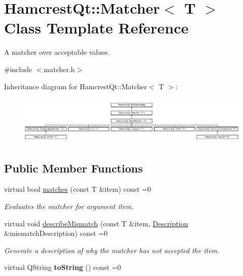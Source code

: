 \hypertarget{class_hamcrest_qt_1_1_matcher}{\section{Hamcrest\-Qt\-:\-:Matcher$<$ T $>$ Class Template Reference}
\label{class_hamcrest_qt_1_1_matcher}
}


A matcher over acceptable values.  




{\ttfamily \#include $<$matcher.\-h$>$}

Inheritance diagram for Hamcrest\-Qt\-:\-:Matcher$<$ T $>$\-:\begin{figure}[H]
\begin{center}
\leavevmode
\includegraphics[height=2.343096cm]{class_hamcrest_qt_1_1_matcher}
\end{center}
\end{figure}
\subsection*{Public Member Functions}
\begin{DoxyCompactItemize}
\item 
virtual bool \hyperlink{class_hamcrest_qt_1_1_matcher_a9a8a775345afd0fde8942a0755303075}{matches} (const T \&item) const =0
\begin{DoxyCompactList}\small\item\em Evaluates the matcher for argument {\itshape item}. \end{DoxyCompactList}\item 
virtual void \hyperlink{class_hamcrest_qt_1_1_matcher_aa92292613ca3c83f0501d261de94cb2b}{describe\-Mismatch} (const T \&item, \hyperlink{class_hamcrest_qt_1_1_description}{Description} \&mismatch\-Description) const =0
\begin{DoxyCompactList}\small\item\em Generate a description of why the matcher has not accepted the item. \end{DoxyCompactList}\item 
\hypertarget{class_hamcrest_qt_1_1_matcher_a9b2e61b3e0ffeb3c5fff553c160f70de}{virtual Q\-String {\bfseries to\-String} () const =0}\label{class_hamcrest_qt_1_1_matcher_a9b2e61b3e0ffeb3c5fff553c160f70de}

\end{DoxyCompactItemize}


